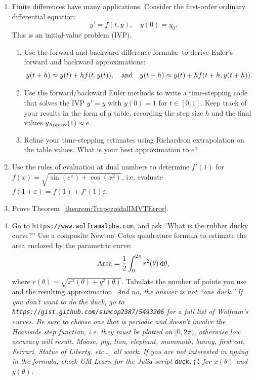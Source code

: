 \begin{enumerate}

\item Finite differences have many applications. Consider the first-order ordinary differential equation:
\[
y' = f(t,y),\quad y(0) = y_0.
\]
This is an initial-value problem (IVP).
\begin{enumerate}
\item Use the forward and backward difference formul\ae~to derive Euler's forward and backward approximations:
\[
y(t+h) \approx y(t) + hf(t,y(t)), \quad{\rm and}\quad y(t+h) \approx y(t) + hf(t+h,y(t+h)).
\]
\item Use the forward/backward Euler methods to write a time-stepping code that solves the IVP $y' = y$ with $y(0) = 1$ for $t\in[0,1]$. Keep track of your results in the form of a table, recording the step size $h$ and the final values $y_{\rm Approx}(1) \approx e$.
\item Refine your time-stepping estimates using Richardson extrapolation on the table values. What is your best approximation to $e$?
\end{enumerate}

\item Use the rules of evaluation at dual numbers to determine $f'(1)$ for $f(x) = \sqrt{\sin(e^x)+\cos(x^2)}$, i.e. evaluate $f(1+\varepsilon) = f(1) + f'(1)\varepsilon$.

\item Prove Theorem~\ref{theorem:TrapezoidalIMVTError}.

\item Go to {\tt https://www.wolframalpha.com}, and ask ``What is the rubber ducky curve?'' Use a composite Newton--Cotes quadrature formula to estimate the area enclosed by the parametric curve:
\[
{\rm Area} = \dfrac{1}{2}\int_0^{2\pi}r^2(\theta){\rm\,d}\theta,
\]
where $r(\theta) = \sqrt{x^2(\theta)+y^2(\theta)}$. Tabulate the number of points you use and the resulting approximation. {\em And no, the answer is not ``one duck.'' If you don't want to do the duck, go to {\tt https://gist.github.com/simcop2387/5493206} for a full list of Wolfram's curves. Be sure to choose one that is periodic and doesn't involve the Heaviside step function, i.e. they must be plotted on $[0,2\pi)$, otherwise low accuracy will result. Moose, pig, lion, elephant, mammoth, bunny, first cat, Ferrari, Statue of Liberty, etc\ldots, all work. If you are not interested in typing in the formula, check UM Learn for the {\sc Julia} script {\tt duck.jl} for $x(\theta)$ and $y(\theta)$.}


\end{enumerate}
